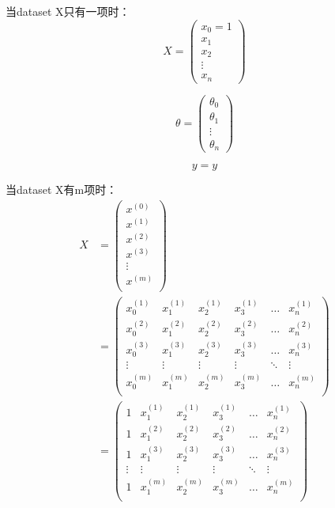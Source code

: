 \documentclass[12pt]{article}   %
\begin{document}
当dataset X只有一项时：
\begin{equation}
X = 
	\left(
		\begin{matrix}
			x_0=1 \\
			x_1 \\
			x_2 \\
			\vdots \\
			x_n
		\end{matrix}
	\right)
\end{equation}

\begin{equation}
\theta = 
	\left(
		\begin{matrix}
			\theta_0 \\
			\theta_1 \\
			\vdots \\
			\theta_n
		\end{matrix}
	\right)
\end{equation}

\begin{equation}
y = y
\end{equation}

当dataset X有m项时：
\begin{equation}
\begin{aligned}
X & = 
	\left(
		\begin{matrix}
			x^{(0)} \\
			x^{(1)} \\
			x^{(2)} \\
			x^{(3)} \\
			\vdots \\
			x^{(m)} \\
		\end{matrix}
	\right) \\
& =
	\left(
		\begin{matrix}
		x_0^{(1)} & x_1^{(1)} & x_2^{(1)} & x_3^{(1)} & \dots & x_n^{(1)} \\
		x_0^{(2)} & x_1^{(2)} & x_2^{(2)} & x_3^{(2)} & \dots & x_n^{(2)} \\
		x_0^{(3)} & x_1^{(3)} & x_2^{(3)} & x_3^{(3)} & \dots & x_n^{(3)} \\
		\vdots    & \vdots    & \vdots    & \vdots    & \ddots & \vdots   \\
		x_0^{(m)} & x_1^{(m)} & x_2^{(m)} & x_3^{(m)} & \dots & x_n^{(m)} \\
		\end{matrix}
	\right) \\
& =
		\left(
		\begin{matrix}
		1 & x_1^{(1)} & x_2^{(1)} & x_3^{(1)} & \dots & x_n^{(1)} \\
		1 & x_1^{(2)} & x_2^{(2)} & x_3^{(2)} & \dots & x_n^{(2)} \\
		1 & x_1^{(3)} & x_2^{(3)} & x_3^{(3)} & \dots & x_n^{(3)} \\
		\vdots    & \vdots    & \vdots    & \vdots    & \ddots & \vdots   \\
		1 & x_1^{(m)} & x_2^{(m)} & x_3^{(m)} & \dots & x_n^{(m)} \\
		\end{matrix}
	\right)
\end{aligned}
\end{equation}
\end{document}
